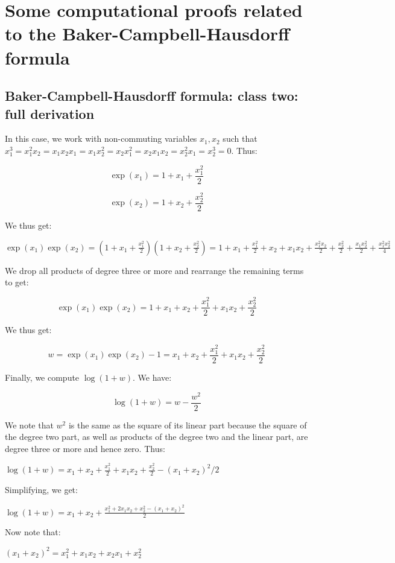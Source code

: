 
\section{Some computational proofs related to the Baker-Campbell-Hausdorff formula}

\subsection{Baker-Campbell-Hausdorff formula: class two: full derivation}\label{appsec:bch-class-two}

In this case, we work with non-commuting variables $x_1,x_2$ such that
$x_1^3 = x_1^2x_2 = x_1x_2x_1 = x_1x_2^2 = x_2x_1^2 = x_2x_1x_2 =
x_2^2x_1 = x_2^3 = 0$. Thus:

$$ \exp(x_1) = 1 + x_1 + \frac{x_1^2}{2}$$

$$ \exp(x_2) = 1 + x_2 + \frac{x_2^2}{2}$$

We thus get:

$\exp(x_1)\exp(x_2) = \left(1 + x_1 + \frac{x_1^2}{2}\right)\left(1 + x_2 + \frac{x_2^2}{2}\right) = 1 + x_1 + \frac{x_1^2}{2} + x_2 + x_1x_2 + \frac{x_1^2x_2}{2} + \frac{x_2^2}{2} + \frac{x_1x_2^2}{2} + \frac{x_1^2x_2^2}{4}$

We drop all products of degree three or more and rearrange the remaining terms to get:

$$ \exp(x_1)\exp(x_2) = 1 + x_1 + x_2 + \frac{x_1^2}{2} + x_1x_2 + \frac{x_2^2}{2}$$

We thus get:

$$ w = \exp(x_1)\exp(x_2) - 1 = x_1 + x_2 + \frac{x_1^2}{2} + x_1x_2 + \frac{x_2^2}{2}$$

Finally, we compute $\log(1 + w)$. We have:

$$\log(1 + w) = w - \frac{w^2}{2}$$

We note that $w^2$ is the same as the square of its linear part
because the square of the degree two part, as well as products of the
degree two and the linear part, are degree three or more and hence
zero. Thus:

$\log(1 + w) = x_1 + x_2 + \frac{x_1^2}{2} + x_1x_2 + \frac{x_2^2}{2} - (x_1 + x_2)^2/2$

Simplifying, we get:

$\log(1 + w) = x_1 + x_2 + \frac{x_1^2 + 2x_1x_2 + x_2^2 - (x_1 + x_2)^2}{2}$

Now note that:

$ (x_1 + x_2)^2 = x_1^2 + x_1x_2 + x_2x_1 + x_2^2$

